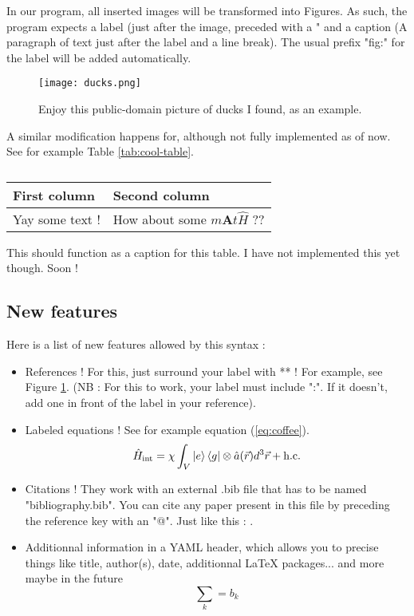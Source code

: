 \documentclass{article}
\begin{document}
\begin{maincontent}
In our program, all inserted images will be transformed into Figures. As such, the program expects a label (just after the image, preceded with a "\label{"),} and a caption (A paragraph of text just after the label and a line break). The usual prefix "fig:" for the label will be added automatically.


\begin{figure}
    \centering
    \texttt{[image: ducks.png]}
    \caption{Enjoy this public-domain picture of ducks I found, as an example.}
    \label{fig:ducks}
\end{figure}
        

A similar modification happens for, although not fully implemented as of now. See for example Table \ref{tab:cool-table}.

\begin{table}
    \centering
    \begin{tabular}{l|l}
First column & Second column \\
\hline
Yay some text ! & How about some $m\mathbf{A}t\hat{H}$ ?? \\

\end{tabular}

    \caption{}
    \label{tab:}
\end{table}
        
\label{cool-table}
This should function as a caption for this table. I have not implemented this yet though. Soon !

\subsection{New features}

Here is a list of new features allowed by this syntax :
\begin{itemize}
\item 
References ! For this, just surround your label with ** ! For example, see Figure \ref{fig:ducks}. (NB : For this to work, your label must include ":". If it doesn't, add one in front of the label in your reference).

\item 
Labeled equations ! See for example equation (\ref{eq:coffee}).\begin{equation}
	\hat{H}_{\text{int}}=\chi\int _{V}\ket{e} \bra{g} \otimes \hat{a}(\vec{r})d^{3}\vec{r}+\text{h.c.}
\label{eq:coffee}\end{equation}


\item 
Citations ! They work with an external .bib file that has to be named "bibliography.bib". You can cite any paper present in this file by preceding the reference key with an "@". Just like this : \cite{Einstein}.

\item 
Additionnal information in a YAML header, which allows you to precise things like title, author(s), date, additionnal LaTeX packages... and more maybe in the future
$$\sum_{k}=b_{k}$$

\end{itemize}

\end{maincontent}
\printbibliography
\end{document}
